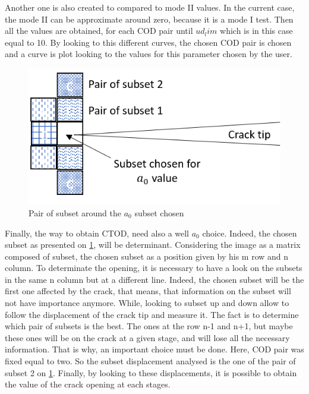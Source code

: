 Another one is also created to compared to mode II values. In the current case, the mode II can be approximate around zero, because it is a mode I test. Then all the values are obtained, for each COD pair until $ud_lim$ which is in this case equal to 10. By looking to this different curves, the chosen COD pair is chosen and a curve is plot looking to the values for this parameter chosen by the user. 

\begin{figure}[h]
	\centering
	\includegraphics[scale=0.7]{Figures/Subset_choice}
	\decoRule
	\caption[Subset choice and pair of subset around]{Pair of subset around the $a_{0}$ subset chosen}
	\label{fig:subest_chosen}
\end{figure}

Finally, the way to obtain CTOD, need also a well $a_{0}$ choice. Indeed, the chosen subset as presented on \ref{fig:subest_chosen}, will be determinant. Considering the image as a matrix composed of subset, the chosen subset as a position given by his m row and n column. To determinate the opening, it is necessary to have a look on the subsets in the same n column but at a different line. Indeed, the chosen subset will be the first one affected by the crack, that means, that information on the subset will not have importance anymore. While, looking to subset up and down allow to follow the displacement of the crack tip and measure it. The fact is to determine which pair of subsets is the best. The ones at the row n-1 and n+1, but maybe these ones will be on the crack at a given stage, and will lose all the necessary information. That is why, an important choice must be done. Here, COD pair was fixed equal to two. So the subset displacement analysed is the one of the pair of subset 2 on \ref{fig:subest_chosen}. Finally, by looking to these displacements, it is possible to obtain the value of the crack opening at each stages.

